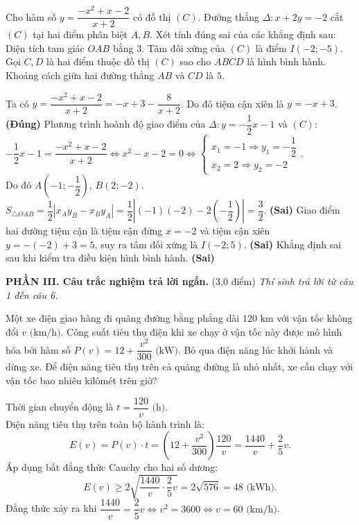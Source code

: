 \begin{ex}
Cho hàm số $y = \dfrac{-x^2+x-2}{x+2}$ có đồ thị $(C)$. Đường thẳng $\Delta\colon x + 2y = -2$ cắt $(C)$ tại hai điểm phân biệt $A, B$. Xét tính đúng sai của các khẳng định sau:
{\True Diện tích tam giác $OAB$ bằng $3$.}
{Tâm đối xứng của $(C)$ là điểm $I(-2; -5)$.}
{Gọi $C, D$ là hai điểm thuộc đồ thị $(C)$ sao cho $ABCD$ là hình bình hành. Khoảng cách giữa hai đường thẳng $AB$ và $CD$ là $5$.}
\begin{loigiai}
\begin{itemchoice}
    \itemch Ta có $y = \dfrac{-x^2+x-2}{x+2} = -x + 3 - \dfrac{8}{x+2}$. Do đó tiệm cận xiên là $y = -x + 3$. \textbf{(Đúng)}
    \itemch Phương trình hoành độ giao điểm của $\Delta\colon y = -\dfrac{1}{2}x - 1$ và $(C)$:
    $-\dfrac{1}{2}x - 1 = \dfrac{-x^2+x-2}{x+2} \Leftrightarrow x^2 - x - 2 = 0 \Leftrightarrow \begin{cases} x_1 = -1 \Rightarrow y_1 = -\dfrac{1}{2} \\ x_2 = 2 \Rightarrow y_2 = -2 \end{cases}$.\\
    Do đó $A\left(-1; -\dfrac{1}{2}\right)$, $B(2; -2)$. $S_{\triangle OAB} = \dfrac{1}{2}\left|x_A y_B - x_B y_A\right| = \dfrac{1}{2}\left|(-1)(-2) - 2\left(-\dfrac{1}{2}\right)\right| = \dfrac{3}{2}$. \textbf{(Sai)}
    \itemch Giao điểm hai đường tiệm cận là tiệm cận đứng $x = -2$ và tiệm cận xiên $y = -(-2) + 3 = 5$, suy ra tâm đối xứng là $I(-2; 5)$. \textbf{(Sai)}
    \itemch Khẳng định sai sau khi kiểm tra điều kiện hình bình hành. \textbf{(Sai)}
\end{itemchoice}
\end{loigiai}
\end{ex}

\vspace{0.5cm}
\noindent
\noindent\textbf{PHẦN III. Câu trắc nghiệm trả lời ngắn.} (3,0 điểm) \textit{Thí sinh trả lời từ câu 1 đến câu 6.}

\begin{ex}
Một xe điện giao hàng đi quãng đường bằng phẳng dài $120\text{ km}$ với vận tốc không đổi $v\text{ (km/h)}$. Công suất tiêu thụ điện khi xe chạy ở vận tốc này được mô hình hóa bởi hàm số $P(v) = 12 + \dfrac{v^2}{300}\text{ (kW)}$. Bỏ qua điện năng lúc khởi hành và dừng xe. Để điện năng tiêu thụ trên cả quãng đường là nhỏ nhất, xe cần chạy với vận tốc bao nhiêu kilômét trên giờ?
\begin{loigiai}
Thời gian chuyển động là $t = \dfrac{120}{v}\text{ (h)}$.\\
Điện năng tiêu thụ trên toàn bộ hành trình là:
\[ E(v) = P(v) \cdot t = \left(12 + \dfrac{v^2}{300}\right) \dfrac{120}{v} = \dfrac{1440}{v} + \dfrac{2}{5}v. \]
Áp dụng bất đẳng thức Cauchy cho hai số dương:
\[ E(v) \ge 2\sqrt{\dfrac{1440}{v} \cdot \dfrac{2}{5}v} = 2\sqrt{576} = 48\text{ (kWh)}. \]
Đẳng thức xảy ra khi $\dfrac{1440}{v} = \dfrac{2}{5}v \Leftrightarrow v^2 = 3600 \Leftrightarrow v = 60\text{ (km/h)}$.
\end{loigiai}
\end{ex}

